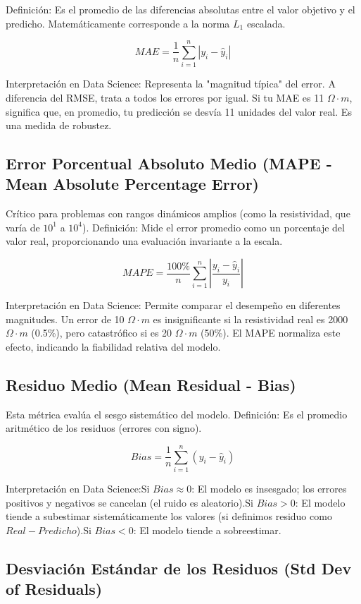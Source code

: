 		Definición: Es el promedio de las diferencias absolutas entre el valor objetivo y el predicho. Matemáticamente corresponde a la norma $L_1$ escalada.
		
		\[
		MAE = \frac{1}{n} \sum_{i=1}^{n} |y_i - \hat{y}_i|
		\]
		
		Interpretación en Data Science: Representa la "magnitud típica" del error. A diferencia del RMSE, trata a todos los errores por igual. Si tu MAE es 11 $\Omega\cdot m$, significa que, en promedio, tu predicción se desvía 11 unidades del valor real. Es una medida de robustez.
		
	\subsection{Error Porcentual Absoluto Medio (MAPE - Mean Absolute Percentage Error)}
	
		Crítico para problemas con rangos dinámicos amplios (como la resistividad, que varía de $10^1$ a $10^4$).
		Definición: Mide el error promedio como un porcentaje del valor real, proporcionando una evaluación invariante a la escala.
		
		\[
		MAPE = \frac{100\%}{n} \sum_{i=1}^{n} \left| \frac{y_i - \hat{y}_i}{y_i} \right|
		\]
		
		Interpretación en Data Science: Permite comparar el desempeño en diferentes magnitudes. Un error de 10 $\Omega\cdot m$ es insignificante si la resistividad real es 2000 $\Omega\cdot m$ (0.5\%), pero catastrófico si es 20 $\Omega\cdot m$ (50\%). El MAPE normaliza este efecto, indicando la fiabilidad relativa del modelo.
		
	\subsection{Residuo Medio (Mean Residual - Bias)}
	
		Esta métrica evalúa el sesgo sistemático del modelo.
		Definición: Es el promedio aritmético de los residuos (errores con signo).
		
		\[
		Bias = \frac{1}{n} \sum_{i=1}^{n} (y_i - \hat{y}_i)
		\]
		
		Interpretación en Data Science:Si $Bias \approx 0$: El modelo es insesgado; los errores positivos y negativos se cancelan (el ruido es aleatorio).Si $Bias > 0$: El modelo tiende a subestimar sistemáticamente los valores (si definimos residuo como $Real - Predicho$).Si $Bias < 0$: El modelo tiende a sobreestimar.
		
	\subsection{Desviación Estándar de los Residuos (Std Dev of Residuals)}
	

